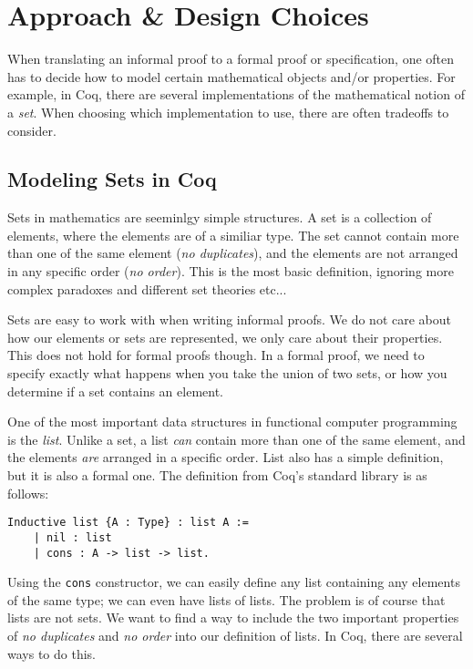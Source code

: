 \chapter{Approach \& Design Choices}

When translating an informal proof to a formal proof or specification,
one often has to decide how to model certain mathematical objects
and/or properties. For example, in Coq, there are several implementations
of the mathematical notion of a \textit{set}. When choosing which implementation
to use, there are often tradeoffs to consider.

\section{Modeling Sets in Coq}

Sets in mathematics are seeminlgy simple structures.
A set is a collection of elements, where the elements are of a similiar type.
The set cannot contain more than one of the same element (\textit{no duplicates}), and the elements are not arranged in any
specific order (\textit{no order}). This is the most basic definition, ignoring more complex paradoxes and different set theories etc...

Sets are easy to work with when writing informal proofs.
We do not care about how our elements or sets are represented, we only care about their properties.
This does not hold for formal proofs though. In a formal proof, we need to specify exactly what happens
when you take the union of two sets, or how you determine if a set contains an element.

\newpage

One of the most important data structures in functional computer programming is the \textit{list}.
Unlike a set, a list \textit{can} contain more than one of the same element, and the elements \textit{are} arranged in a
specific order.
List also has a simple definition, but it is also a formal one. The definition from Coq's standard library is as follows:

\begin{lstlisting}[language=Coq, label=list_def, caption={The definition of a list in Coq}]
Inductive list {A : Type} : list A :=
    | nil : list
    | cons : A -> list -> list.
\end{lstlisting}

Using the \lstinline[language=Coq]{cons} constructor, we can easily define any list containing any elements of the same type;
we can even have lists of lists.
The problem is of course that lists are not sets. We want to find a way to include the two important properties
of \textit{no duplicates} and \textit{no order} into our definition of lists.
In Coq, there are several ways to do this.

